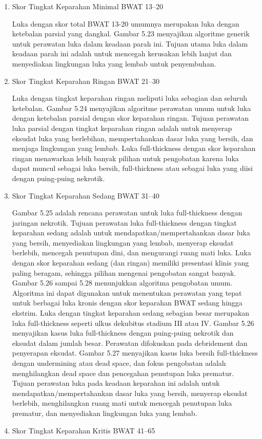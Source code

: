 \begin{enumerate}
	\item Skor Tingkat Keparahan Minimal BWAT 13–20
	
	Luka dengan skor total BWAT 13-20 umumnya merupakan luka dengan ketebalan parsial yang dangkal. Gambar 5.23 menyajikan algoritme generik untuk perawatan luka dalam keadaan parah ini. Tujuan utama luka dalam keadaan parah ini adalah untuk mencegah kerusakan lebih lanjut dan menyediakan lingkungan luka yang lembab untuk penyembuhan.
	\item Skor Tingkat Keparahan Ringan BWAT 21–30
	
	Luka dengan tingkat keparahan ringan meliputi luka sebagian dan seluruh ketebalan. Gambar 5.24 menyajikan algoritme perawatan umum untuk luka dengan ketebalan parsial dengan skor keparahan ringan. Tujuan perawatan luka parsial dengan tingkat keparahan ringan adalah untuk menyerap eksudat luka yang berlebihan, mempertahankan dasar luka yang bersih, dan menjaga lingkungan yang lembab. Luka full-thickness dengan skor keparahan ringan menawarkan lebih banyak pilihan untuk pengobatan karena luka dapat muncul sebagai luka bersih, full-thickness atau sebagai luka yang diisi dengan puing-puing nekrotik.
	\item Skor Tingkat Keparahan Sedang BWAT 31–40
	
	Gambar 5.25 adalah rencana perawatan untuk luka full-thickness dengan jaringan nekrotik. Tujuan perawatan luka full-thickness dengan tingkat keparahan sedang adalah untuk mendapatkan/mempertahankan dasar luka yang bersih, menyediakan lingkungan yang lembab, menyerap eksudat berlebih, mencegah penutupan dini, dan mengurangi ruang mati luka. Luka dengan skor keparahan sedang (dan ringan) memiliki presentasi klinis yang paling beragam, sehingga pilihan mengenai pengobatan sangat banyak.
Gambar 5.26 sampai 5.28 menunjukkan algoritma pengobatan umum. Algoritma ini dapat digunakan untuk menentukan perawatan yang tepat untuk berbagai luka kronis dengan skor keparahan BWAT sedang hingga ekstrim. Luka dengan tingkat keparahan sedang sebagian besar merupakan luka full-thickness seperti ulkus dekubitus stadium III atau IV. Gambar 5.26 menyajikan kasus luka full-thickness dengan puing-puing nekrotik dan eksudat dalam jumlah besar. Perawatan difokuskan pada debridement dan penyerapan eksudat. Gambar 5.27 menyajikan kasus luka bersih full-thickness dengan undermining atau dead space, dan fokus pengobatan adalah menghilangkan dead space dan pencegahan penutupan luka prematur. Tujuan perawatan luka pada keadaan keparahan ini adalah untuk mendapatkan/mempertahankan dasar luka yang bersih, menyerap eksudat berlebih, menghilangkan ruang mati untuk mencegah penutupan luka prematur, dan menyediakan lingkungan luka yang lembab.
	\item Skor Tingkat Keparahan Kritis BWAT 41–65
	

\end{enumerate}

